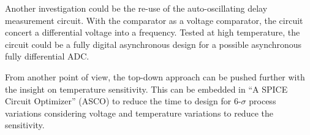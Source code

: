 Another investigation could be the re-use of the auto-oscillating delay measurement circuit. With the comparator as a voltage comparator, the circuit concert a differential voltage into a frequency. Tested at high temperature, the circuit could be a fully digital asynchronous design for a possible asynchronous fully differential ADC\@.

From another point of view, the top-down approach can be pushed further with the insight on temperature sensitivity. This can be embedded in ``A SPICE Circuit Optimizer'' (ASCO) to reduce the time to design for 6-$\sigma$ process variations considering voltage and temperature variations to reduce the sensitivity.
